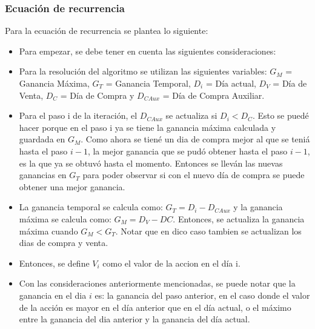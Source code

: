 \documentclass[a4paper, 10pt]{article}
\begin{document}
            \subsubsection{Ecuación de recurrencia}
                Para la ecuación de recurrencia se plantea lo siguiente: \\
                \begin{itemize}
                  \item Para empezar, se debe tener en cuenta las siguientes consideraciones:

                  \item Para la resolución del algoritmo se utilizan las siguientes variables:
                  $ G_{M} $  = Ganancia Máxima, $G_{T}$ = Ganancia Temporal, $ D_{i}$ = Día actual,
                  $D_{V}$ = Día de Venta, $D_{C}$ = Día de Compra y $D_{CAux}$ = Día de Compra Auxiliar.

                  \item Para el paso i de la iteración, el $D_{CAux}$ se actualiza si $D_{i} < D_{C}$.
                  Esto se puedé hacer porque en el paso i ya se tiene la ganancia máxima calculada y guardada
                  en $G_{M}$. Como ahora se tiené un dia de compra mejor al que se teniá hasta el paso $i-1$,
                  la mejor ganancia que se pudó obtener hasta el paso $i-1$, es la que ya se obtuvó hasta el momento.
                  Entonces se lleván las nuevas ganancias en $G_{T}$ para poder observar si con el nuevo día de
                  compra se puede obtener una mejor ganancia.

                  \item La ganancia temporal se calcula como: $G_{T} = D_{i} - D_{CAux}$ y la ganancia máxima se calcula
                  como: $G_{M} = D_{V} - D{C}$. Entonces, se actualiza la ganancia máxima cuando $G_{M} < G_{T}$. Notar que en
                  dico caso tambien se actualizan los dias de compra y venta.

                  \item Entonces, se define $V_{i}$ como el valor de la accion en el día i.

                  \item Con las consideraciones anteriormente mencionadas, se puede notar que la ganancia en el dia $i$ es:
                  la ganancia del paso anterior, en el caso donde el valor de la acción es mayor en el día anterior que en el
                  día actual, o el máximo entre la ganancia del dia anterior y la ganancia del día actual.


\end{itemize}
\end{document}
